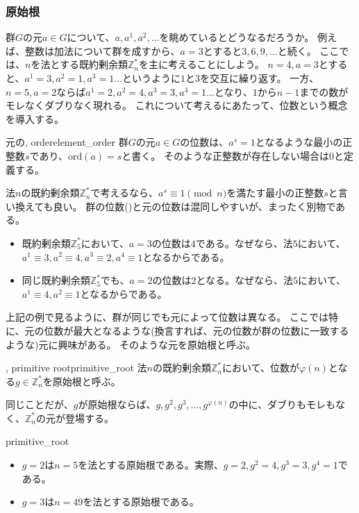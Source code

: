 \subsubsection{原始根}
群$G$の元$a\in G$について、$a, a^1, a^2,\ldots$を眺めているとどうなるだろうか。
例えば、整数は加法について群を成すから、$a=3$とすると$3,6,9,\ldots$と続く。
ここでは、$n$を法とする既約剰余類$\mathbb{Z}_n^*$を主に考えることにしよう。
$n=4,a=3$とすると、$a^1=3,a^2=1,a^3=1\ldots$というように$1$と$3$を交互に繰り返す。
一方、$n=5,a=2$ならば$a^1=2,a^2=4,a^3=3,a^4=1\ldots$となり、$1$から$n-1$までの数がモレなくダブりなく現れる。
これについて考えるにあたって、位数という概念を導入する。

\begin{Defi}{元の, order}{element_order}
群$G$の元$a\in G$の位数は、$a^s = 1$となるような最小の正整数$s$であり、$\mbox{ord}(a)=s$と書く。
そのような正整数が存在しない場合は$0$と定義する。
\end{Defi}

法$n$の既約剰余類$\mathbb{Z}_n^*$で考えるなら、$a^s \equiv 1 \pmod{n}$を満たす最小の正整数$s$と言い換えても良い。
群の位数()と元の位数は混同しやすいが、まったく別物である。

\begin{Exam}{}{}\;
\begin{itemize}
 \item 既約剰余類$\mathbb{Z}_{5}^*$において、$a=3$の位数は$4$である。なぜなら、法$5$において、$a^1\equiv3,a^2\equiv4,a^3\equiv2,a^4\equiv1$となるからである。
 \item 同じ既約剰余類$\mathbb{Z}_{5}^*$でも、$a=2$の位数は$2$となる。なぜなら、法$5$において、$a^1\equiv4,a^2\equiv1$となるからである。
\end{itemize}
\end{Exam}

上記の例で見るように、群が同じでも元によって位数は異なる。
ここでは特に、元の位数が最大となるような(換言すれば、元の位数が群の位数に一致するような)元に興味がある。
そのような元を原始根と呼ぶ。

\begin{Defi}{, primitive root}{primitive_root}
法$n$の既約剰余類$\mathbb{Z}_n^*$において、位数が$\varphi(n)$となる$g\in\mathbb{Z}_n^*$を原始根と呼ぶ。
\end{Defi}

同じことだが、$g$が原始根ならば、$g,g^2,g^3,\ldots,g^{\varphi(n)}$の中に、ダブりもモレもなく、$\mathbb{Z}_n^*$の元が登場する。
\begin{Exam}{}{primitive_root}\;
\begin{itemize}
 \item $g=2$は$n=5$を法とする原始根である。実際、$g=2,g^2=4,g^3=3,g^4=1$である。
 \item $g=3$は$n=49$を法とする原始根である。
\end{itemize}
\end{Exam}

